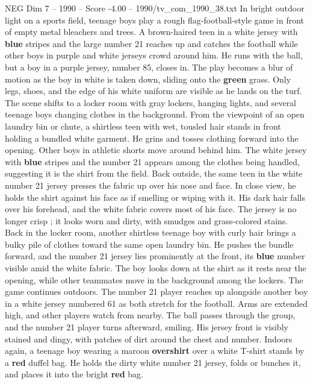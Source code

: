 \begin{textsample}{NEG Dim 7 – 1990 – Score -4.00 – 1990/tv\_com\_1990\_38.txt}  \label{ex:f7_neg_036}
In bright outdoor light on a sports field, teenage boys play a rough flag-football-style game in front of empty metal bleachers and trees.
A brown-haired teen in a white jersey with \textbf{blue} stripes and the large number 21 reaches up and catches the football while other boys in purple and white jerseys crowd around him.
He runs with the ball, but a boy in a purple jersey, number 85, closes in.
The play becomes a blur of motion as the boy in white is taken down, sliding onto the \textbf{green} grass.
Only legs, shoes, and the edge of his white uniform are visible as he lands on the turf.
The scene shifts to a locker room with gray lockers, hanging lights, and several teenage boys changing clothes in the background.
From the viewpoint of an open laundry bin or chute, a shirtless teen with wet, tousled hair stands in front holding a bundled white garment.
He grins and tosses clothing forward into the opening.
Other boys in athletic shorts move around behind him.
The white jersey with \textbf{blue} stripes and the number 21 appears among the clothes being handled, suggesting it is the shirt from the field.
Back outside, the same teen in the white number 21 jersey presses the fabric up over his nose and face.
In close view, he holds the shirt against his face as if smelling or wiping with it.
His dark hair falls over his forehead, and the white fabric covers most of his face.
The jersey is no longer crisp ; it looks worn and dirty, with smudges and grass-colored stains.
Back in the locker room, another shirtless teenage boy with curly hair brings a bulky pile of clothes toward the same open laundry bin.
He pushes the bundle forward, and the number 21 jersey lies prominently at the front, its \textbf{blue} number visible amid the white fabric.
The boy looks down at the shirt as it rests near the opening, while other teammates move in the background among the lockers.
The game continues outdoors.
The number 21 player reaches up alongside another boy in a white jersey numbered 61 as both stretch for the football.
Arms are extended high, and other players watch from nearby.
The ball passes through the group, and the number 21 player turns afterward, smiling.
His jersey front is visibly stained and dingy, with patches of dirt around the chest and number.
Indoors again, a teenage boy wearing a maroon \textbf{overshirt} over a white T-shirt stands by a \textbf{red} duffel bag.
He holds the dirty white number 21 jersey, folds or bunches it, and places it into the bright \textbf{red} bag.

\end{textsample}
